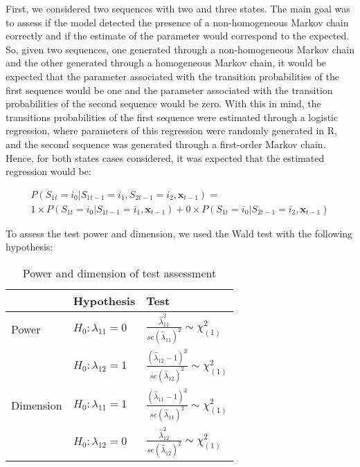 First, we considered two sequences with two and three states. The main goal was to assess if the model detected the presence of a non-homogeneous Markov chain correctly and if the estimate of the parameter would correspond to the expected. So, given two sequences, one generated through a non-homogeneous Markov chain and the other generated through a homogeneous Markov chain, it would be expected that the parameter associated with the transition probabilities of the first sequence would be one and the parameter associated with the transition probabilities of the second sequence would be zero. With this in mind, the transitions probabilities of the first sequence were estimated through a logistic regression, where parameters of this regression were randomly generated in R, and the second sequence was generated through a first-order Markov chain. Hence, for both states cases considered, it was expected that the estimated regression would be:

\begin{multline} 
P(S_{1t} =  i_0 | S_{1t-1} = i_1, S_{2t-1} = i_2, \boldsymbol{x}_{t-1}) = \\
1 \times P(S_{1t} =  i_0 | S_{1t-1} = i_1,\boldsymbol{x}_{t-1}) +  0 \times P(S_{1t} =  i_0 | S_{2t-1} = i_2, \boldsymbol{x}_{t-1}) \label{eq:eq11}
\end{multline}

To assess the test power and dimension, we used the Wald test with the following hypothesis:

\begin{table}

\caption{\label{tab:dim-pow-tex}Power and dimension of test assessment}
\centering
\begin{tabular}[t]{l|l|l}
\hline
 & Hypothesis & Test\\
\hline
Power & $H_0: \lambda_{11} = 0$ & $\frac{\widehat{\lambda}_{11}^2}{se(\widehat{\lambda}_{11})^2} \sim \chi^2_{(1)}$\\
\hline
 & $H_0: \lambda_{12} = 1$ & $\frac{(\widehat{\lambda}_{12}-1)^2}{se(\widehat{\lambda}_{12})^2} \sim \chi^2_{(1)}$\\
\hline
Dimension & $H_0: \lambda_{11} = 1$ & $\frac{(\widehat{\lambda}_{11}-1)^2}{se(\widehat{\lambda}_{11})^2} \sim \chi^2_{(1)}$\\
\hline
 & $H_0: \lambda_{12} = 0$ & $\frac{\widehat{\lambda}_{12}^2}{se(\widehat{\lambda}_{12})^2} \sim \chi^2_{(1)}$\\
\hline
\end{tabular}
\end{table}

